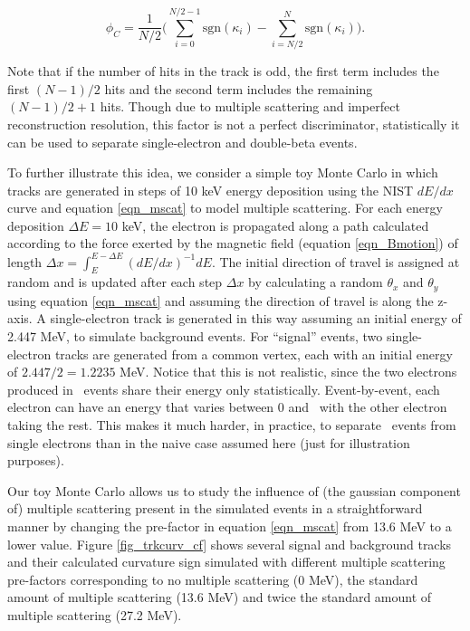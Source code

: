 \documentclass{JINST}
\begin{document}
\begin{equation}\label{eqn_assym}
\phi_{C} = \frac{1}{N/2}\Biggl(\sum_{i=0}^{N/2-1}\mathrm{sgn}(\kappa_{i}) - \sum_{i=N/2}^{N}\mathrm{sgn}(\kappa_{i})\Biggr).
\end{equation}

Note that if the number of hits in the track is odd, the first term includes the first $(N-1)/2$ hits and
the second term includes the remaining $(N-1)/2 + 1$ hits.  Though due to multiple scattering and imperfect
reconstruction resolution, this factor is not a perfect discriminator, statistically it can be used to separate 
single-electron and double-beta events.  

To further illustrate this idea, we consider a simple toy Monte Carlo in which tracks are generated in steps of 10 keV energy
deposition using the NIST $dE/dx$ curve and equation \ref{eqn_mscat} to model multiple scattering.  For each energy 
deposition $\Delta E = 10$ keV, the electron is propagated along a path calculated according to the force exerted
by the magnetic field (equation \ref{eqn_Bmotion}) of length $\Delta x = \int_{E}^{E-\Delta E}(dE/dx)^{-1}dE$.   The
initial direction of travel is assigned at random and is updated after each step $\Delta x$ 
by calculating a random $\theta_x$ and $\theta_y$ using equation \ref{eqn_mscat} and
assuming the direction of travel is along the z-axis.  A single-electron track is generated in this way 
assuming an initial energy of 2.447 MeV, to simulate background events.  For ``signal'' events, two 
single-electron tracks are generated from a common vertex, each with an initial energy of $2.447/2 = 1.2235$ MeV. Notice that this is not realistic, since the two electrons produced in \bbonu\ events share their energy only statistically. Event-by-event, each electron can have an energy that varies between 0 and \Qbb\, with the other electron taking the rest. This makes it much harder, in practice, to separate \bbonu\ events from single electrons than in the naive case assumed here (just for illustration purposes).

Our toy Monte Carlo allows us to study the influence of (the gaussian component of) multiple scattering present in the simulated events in a
straightforward manner by changing the pre-factor in equation \ref{eqn_mscat} from 13.6 MeV to a lower value.  
Figure \ref{fig_trkcurv_cf} shows several signal and background tracks and their calculated curvature sign 
simulated with different multiple scattering pre-factors corresponding to no multiple scattering (0 MeV), the 
standard amount of multiple scattering (13.6 MeV) and twice the standard amount of multiple scattering (27.2 
MeV).  
\end{document}
